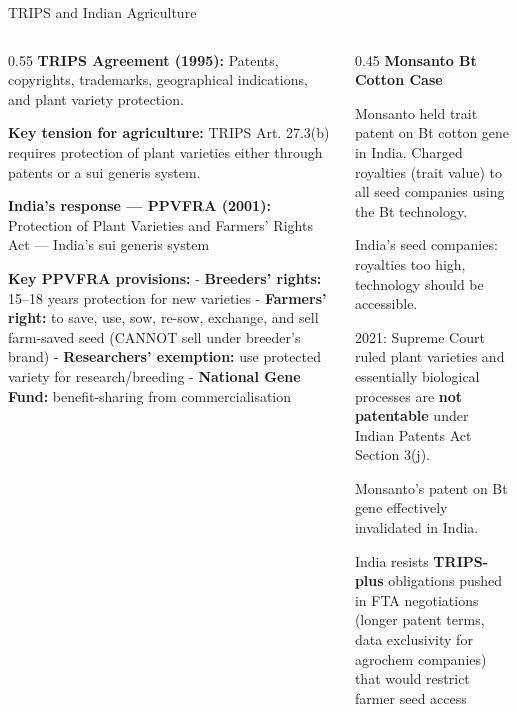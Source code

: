 \documentclass[
  ignorenonframetext,
  aspectratio=169,
]{beamer}
\makeatletter
\let\quarto@originallabel\label
\DeclareRobustCommand*{\label}[1]{\quarto@originallabel{#1}}
\makeatother
\begin{document}
\begin{frame}{TRIPS and Indian Agriculture}
\label{trips-and-indian-agriculture}
\begin{columns}[T]
\begin{column}{0.55\linewidth}
\textbf{TRIPS Agreement (1995):} Patents, copyrights, trademarks,
geographical indications, and plant variety protection.

\textbf{Key tension for agriculture:} TRIPS Art. 27.3(b) requires
protection of plant varieties either through patents or a sui generis
system.

\textbf{India's response --- PPVFRA (2001):} Protection of Plant
Varieties and Farmers' Rights Act --- India's sui generis system

\textbf{Key PPVFRA provisions:} - \textbf{Breeders' rights:} 15--18
years protection for new varieties - \textbf{Farmers' right:} to save,
use, sow, re-sow, exchange, and sell farm-saved seed (CANNOT sell under
breeder's brand) - \textbf{Researchers' exemption:} use protected
variety for research/breeding - \textbf{National Gene Fund:}
benefit-sharing from commercialisation
\end{column}

\begin{column}{0.45\linewidth}
\textbf{Monsanto Bt Cotton Case}

Monsanto held trait patent on Bt cotton gene in India. Charged royalties
(trait value) to all seed companies using the Bt technology.

India's seed companies: royalties too high, technology should be
accessible.

2021: Supreme Court ruled plant varieties and essentially biological
processes are \textbf{not patentable} under Indian Patents Act Section
3(j).

Monsanto's patent on Bt gene effectively invalidated in India.

India resists \textbf{TRIPS-plus} obligations pushed in FTA negotiations
(longer patent terms, data exclusivity for agrochem companies) that
would restrict farmer seed access
\end{column}
\end{columns}
\end{frame}
\end{document}
